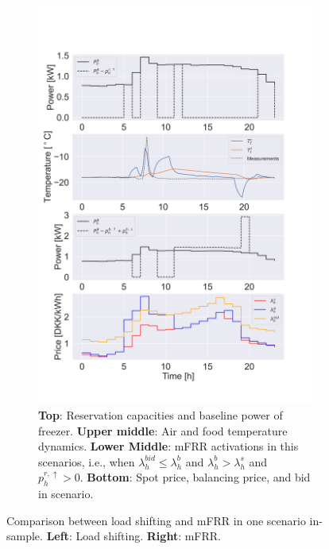 \documentclass[11pt,a4paper]{article}
\begin{document}
\begin{figure}[H]
{\begin{subfigure}[t]{.65\textwidth}
            \includegraphics[width=.95\linewidth]{figures/mFRR_single_case.png}
            \caption{\textbf{Top}: Reservation capacities and baseline power of freezer. \textbf{Upper middle}: Air and food temperature dynamics. \textbf{Lower Middle}: mFRR activations in this scenarios, i.e., when $\lambda_{h}^{bid} \leq \lambda_{h}^{b}$ and $\lambda_{h}^{b} > \lambda_{h}^{s}$ and $p^{r,\uparrow}_{h} > 0$. \textbf{Bottom}: Spot price, balancing price, and bid in scenario.}
            \label{fig:mFRR_single_case}
        \end{subfigure}%
    }
    \caption{Comparison between load shifting and mFRR in one scenario in-sample. \textbf{Left}: Load shifting. \textbf{Right}: mFRR.}
    \label{fig:load_shift_case_vs_mFRR_case}
\end{figure}
\end{document}
